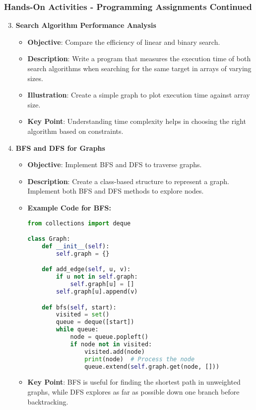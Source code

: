\documentclass[aspectratio=169]{beamer}
\begin{document}
\begin{frame}[fragile]
    \frametitle{Hands-On Activities - Programming Assignments Continued}
    \begin{enumerate}
        \setcounter{enumi}{2}
        \item \textbf{Search Algorithm Performance Analysis}
            \begin{itemize}
                \item \textbf{Objective}: Compare the efficiency of linear and binary search.
                \item \textbf{Description}: Write a program that measures the execution time of both search algorithms when searching for the same target in arrays of varying sizes.
                \item \textbf{Illustration}: Create a simple graph to plot execution time against array size.
                \item \textbf{Key Point}: Understanding time complexity helps in choosing the right algorithm based on constraints.
            \end{itemize}
        \item \textbf{BFS and DFS for Graphs}
            \begin{itemize}
                \item \textbf{Objective}: Implement BFS and DFS to traverse graphs.
                \item \textbf{Description}: Create a class-based structure to represent a graph. Implement both BFS and DFS methods to explore nodes.
                \item \textbf{Example Code for BFS:}
                \begin{lstlisting}[language=Python]
from collections import deque

class Graph:
    def __init__(self):
        self.graph = {}

    def add_edge(self, u, v):
        if u not in self.graph:
            self.graph[u] = []
        self.graph[u].append(v)

    def bfs(self, start):
        visited = set()
        queue = deque([start])
        while queue:
            node = queue.popleft()
            if node not in visited:
                visited.add(node)
                print(node)  # Process the node
                queue.extend(self.graph.get(node, []))
                \end{lstlisting}
                \item \textbf{Key Point}: BFS is useful for finding the shortest path in unweighted graphs, while DFS explores as far as possible down one branch before backtracking.
            \end{itemize}
    \end{enumerate}
\end{frame}
\end{document}
